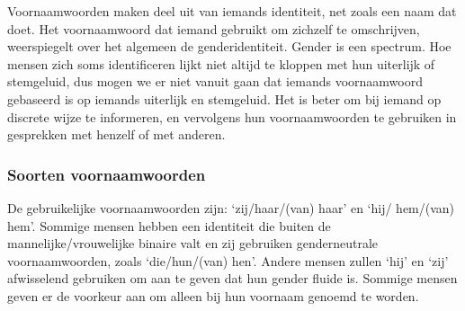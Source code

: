 \documentclass[12pt,openany]{book}
\renewcommand\fbox{\fcolorbox{darkgray}{purple}}
\begin{document}
\begin{figure}[h]
    \centering
\end{figure}

Voornaamwoorden maken deel uit van iemands identiteit, net zoals een naam dat doet. Het voornaamwoord dat iemand gebruikt om zichzelf te omschrijven, weerspiegelt over het algemeen de genderidentiteit. Gender is een spectrum. Hoe mensen zich soms identificeren lijkt niet altijd te kloppen met hun uiterlijk of stemgeluid, dus mogen we er niet vanuit gaan dat iemands voornaamwoord gebaseerd is op iemands uiterlijk en stemgeluid. Het is beter om bij iemand op discrete wijze te informeren, en vervolgens hun voornaamwoorden te gebruiken in gesprekken met henzelf of met anderen.

\noindent\fbox{%
    \parbox{\textwidth}{%
\textit{\textbf{\Large \textcolor{white}{`Zij/hun/(van) hen' voornaamwoorden}}}

\bigskip

\textcolor{white}{In het Engels wordt `they/them/their' gebruikt als een enkele persoon wordt bedoeld waarvan gegenderde voornaamwoorden nog onbekend zijn. Deze genderneutrale voornaamwoorden hebben een gebruiksgeschiedenis die teruggaat naar het jaar 1375. In het Nederlands kun je `diegene' of `die persoon', of `hun/hen' zeggen. Genderneutraal is ook: `Iemand heeft hier een paraplu achtergelaten'. `Hoe kunnen we erachter komen van wie de paraplu is?' Of `Ik weet niet zeker welke voornaamwoorden ik zou moeten gebruiken. Ik zal het diegene de volgende keer vragen'.}
    }%
}

\subsubsection*{Soorten voornaamwoorden}

De gebruikelijke voornaamwoorden zijn: `zij/haar/(van) haar' en `hij/ hem/(van) hem'. Sommige mensen hebben een identiteit die buiten de mannelijke/vrouwelijke binaire valt en zij gebruiken genderneutrale voornaamwoorden, zoals `die/hun/(van) hen'. Andere mensen zullen `hij' en `zij' afwisselend gebruiken om aan te geven dat hun gender fluide is. Sommige mensen geven er de voorkeur aan om alleen bij hun voornaam genoemd te worden.
\end{document}
